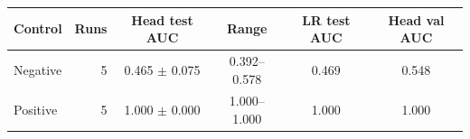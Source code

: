\begin{tabular}{lrcccc}
\toprule
Control & Runs & Head test AUC & Range & LR test AUC & Head val AUC \\
\midrule
Negative & 5 & 0.465 $\pm$ 0.075 & 0.392--0.578 & 0.469 & 0.548 \\
Positive & 5 & 1.000 $\pm$ 0.000 & 1.000--1.000 & 1.000 & 1.000 \\
\bottomrule
\end{tabular}
